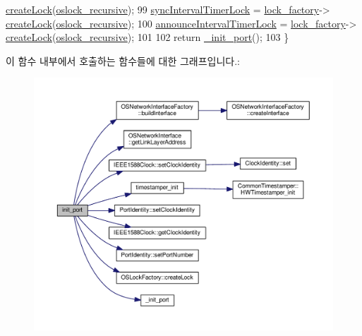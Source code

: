 \begin{DoxyCode}
      \hyperlink{class_o_s_lock_factory_ac0789ff714468962f0c1a317d7774585}{createLock}(\hyperlink{avbts__oslock_8hpp_a88e6fcd587e202a0bf3d0318d8fff8bbafd42ae3474dea6ba3413104730fb1063}{oslock\_recursive});
99     \hyperlink{class_common_port_a2457c760017e253f1202eb8cfef7c00b}{syncIntervalTimerLock} = \hyperlink{class_common_port_a79c67e28bcaacaa0f11c04682d085b36}{lock\_factory}->
      \hyperlink{class_o_s_lock_factory_ac0789ff714468962f0c1a317d7774585}{createLock}(\hyperlink{avbts__oslock_8hpp_a88e6fcd587e202a0bf3d0318d8fff8bbafd42ae3474dea6ba3413104730fb1063}{oslock\_recursive});
100     \hyperlink{class_common_port_a652fe375b2664ee0bedbc5c31a3556df}{announceIntervalTimerLock} = \hyperlink{class_common_port_a79c67e28bcaacaa0f11c04682d085b36}{lock\_factory}->
      \hyperlink{class_o_s_lock_factory_ac0789ff714468962f0c1a317d7774585}{createLock}(\hyperlink{avbts__oslock_8hpp_a88e6fcd587e202a0bf3d0318d8fff8bbafd42ae3474dea6ba3413104730fb1063}{oslock\_recursive});
101 
102     \textcolor{keywordflow}{return} \hyperlink{class_common_port_a5d364e6573c21517d6b9bd301a3f3543}{\_init\_port}();
103 \}
\end{DoxyCode}


이 함수 내부에서 호출하는 함수들에 대한 그래프입니다.\+:
\nopagebreak
\begin{figure}[H]
\begin{center}
\leavevmode
\includegraphics[width=350pt]{class_common_port_ae2f86408116b0a551da01c6f92f03ff9_cgraph}
\end{center}
\end{figure}




